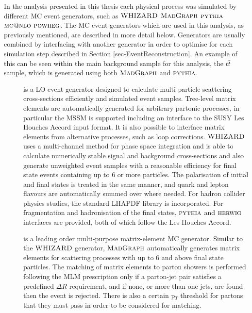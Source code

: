 In the analysis presented in this thesis each physical process was simulated by different MC event generators, such as ${\textsc{WHIZARD}}$ $\textsc{MadGraph}$ ${\textsc{pythia}}$ $\textsc{mc@nlo}$ ${\textsc{powheg}}$. The MC event generators which are used in this analysis, as previously mentioned, are described in more detail below. Generators are usually combined by interfacing with another generator in order to optimise for each simulation step described in Section \ref{sec-EventReconstruction}. An example of this can be seen within the main background sample for this analysis, the $t\bar{t}$ sample, which is generated using both $\textsc{MadGraph}$ and ${\textsc{pythia}}$.   

\begin{description}

	\item[\WHIZARD] \cite{WHIZARD} is a LO event generator designed to calculate multi-particle scattering cross-sections efficiently and simulated event samples. Tree-level matrix elements are automatically generated for arbitrary partonic processes, in particular the MSSM is supported including an interface to the SUSY Les Houches Accord input format. It is also possible to interface matrix elements from alternative processes, such as loop corrections. ${\textsc{WHIZARD}}$ uses a multi-channel method for phase space integration and is able to calculate numerically stable signal and background cross-sections and also generate unweighted event samples with a reasonable efficiency for final state events containing up to 6 or more particles. The polarisation of initial and final states is treated in the same manner, and quark and lepton flavours are automatically summed over where needed. For hadron collider physics studies, the standard LHAPDF library is incorporated. For fragmentation and hadronisation of the final states, ${\textsc{pythia}}$ and ${\textsc{herwig}}$ interfaces are provided, both of which follow the Les Houches Accord.

	\item[\MADGRAPH] \cite{MADGRAPH5} is a leading order multi-purpose matrix-element MC generator. Similar to the ${\textsc{WHIZARD}}$ generator, $\textsc{MadGraph}$ automatically generates matrix elements for scattering processes with up to 6 and above final state particles. The matching of matrix elements to parton showers is performed following the MLM prescription \cite{Hoche:2006ph} only if a parton-jet pair satisfies a predefined $\Delta R$ requirement, and if none, or more than one jets, are found then the event is rejected. There is also a certain p$_T$ threshold for partons that they must pass in order to be considered for matching.


\end{description}
